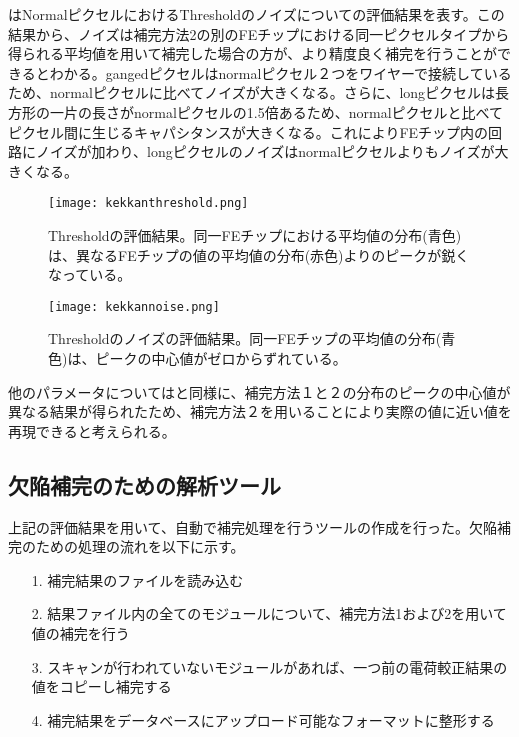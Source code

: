 はNormalピクセルにおけるThresholdのノイズについての評価結果を表す。この結果から、ノイズは補完方法2の別のFEチップにおける同一ピクセルタイプから得られる平均値を用いて補完した場合の方が、より精度良く補完を行うことができるとわかる。gangedピクセルはnormalピクセル２つをワイヤーで接続しているため、normalピクセルに比べてノイズが大きくなる。さらに、longピクセルは長方形の一片の長さがnormalピクセルの1.5倍あるため、normalピクセルと比べてピクセル間に生じるキャパシタンスが大きくなる。これによりFEチップ内の回路にノイズが加わり、longピクセルのノイズはnormalピクセルよりもノイズが大きくなる。


\begin{figure}[tbp]
  \begin{minipage}[b]{0.5\linewidth}
    \centering
    \texttt{[image: kekkanthreshold.png]}
    \caption[Thresholdの評価結果]{Thresholdの評価結果。同一FEチップにおける平均値の分布(青色)は、異なるFEチップの値の平均値の分布(赤色)よりのピークが鋭くなっている。}
    \label{fig:kekkanthreshold}
  \end{minipage}
  \begin{minipage}[b]{0.5\linewidth}
    \centering
    \texttt{[image: kekkannoise.png]}
    \caption[Thresholdのノイズの評価結果]{Thresholdのノイズの評価結果。同一FEチップの平均値の分布(青色)は、ピークの中心値がゼロからずれている。\\}
    \label{fig:kekkannoise}
  \end{minipage}
\end{figure}

他のパラメータについてはと同様に、補完方法１と２の分布のピークの中心値が異なる結果が得られたため、補完方法２を用いることにより実際の値に近い値を再現できると考えられる。

\subsection{欠陥補完のための解析ツール}
上記の評価結果を用いて、自動で補完処理を行うツールの作成を行った。欠陥補完のための処理の流れを以下に示す。
\begin{itemize}
  \item[1. ] 補完結果のファイルを読み込む
  \item[2. ] 結果ファイル内の全てのモジュールについて、補完方法1および2を用いて値の補完を行う
  \item[3. ] スキャンが行われていないモジュールがあれば、一つ前の電荷較正結果の値をコピーし補完する
  \item[4. ] 補完結果をデータベースにアップロード可能なフォーマットに整形する
\end{itemize}

